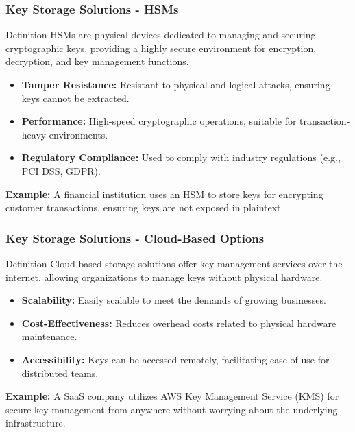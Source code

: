 \documentclass{beamer}
\begin{document}
\begin{frame}[fragile]
    \frametitle{Key Storage Solutions - HSMs}
    \begin{block}{Definition}
        HSMs are physical devices dedicated to managing and securing cryptographic keys, providing a highly secure environment for encryption, decryption, and key management functions.
    \end{block}

    \begin{itemize}
        \item \textbf{Tamper Resistance:} Resistant to physical and logical attacks, ensuring keys cannot be extracted.
        \item \textbf{Performance:} High-speed cryptographic operations, suitable for transaction-heavy environments.
        \item \textbf{Regulatory Compliance:} Used to comply with industry regulations (e.g., PCI DSS, GDPR).
    \end{itemize}

    \textbf{Example:} A financial institution uses an HSM to store keys for encrypting customer transactions, ensuring keys are not exposed in plaintext.
\end{frame}

\begin{frame}[fragile]
    \frametitle{Key Storage Solutions - Cloud-Based Options}
    \begin{block}{Definition}
        Cloud-based storage solutions offer key management services over the internet, allowing organizations to manage keys without physical hardware.
    \end{block}

    \begin{itemize}
        \item \textbf{Scalability:} Easily scalable to meet the demands of growing businesses.
        \item \textbf{Cost-Effectiveness:} Reduces overhead costs related to physical hardware maintenance.
        \item \textbf{Accessibility:} Keys can be accessed remotely, facilitating ease of use for distributed teams.
    \end{itemize}

    \textbf{Example:} A SaaS company utilizes AWS Key Management Service (KMS) for secure key management from anywhere without worrying about the underlying infrastructure.
\end{frame}
\end{document}
